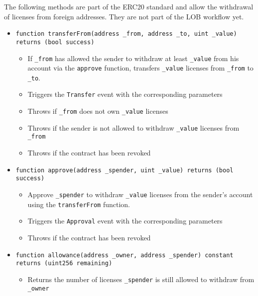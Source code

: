 \documentclass[a4paper]{article}
\begin{document}
\vspace{3mm}

The following methods are part of the ERC20 standard and allow the withdrawal of licenses from foreign addresses. They are not part of the LOB workflow yet.

\vspace{3mm}

\begin{itemize}
  \item \texttt{function transferFrom(address \_from, address \_to, uint \_value) returns (bool success)}
  \begin{itemize}
    \item If \texttt{\_from} has allowed the sender to withdraw at least \texttt{\_value} from his account via the \texttt{approve} function, transfers \texttt{\_value} licenses from \texttt{\_from} to \texttt{\_to}.
    \item Triggers the \texttt{Transfer} event with the corresponding parameters
    \item Throws if \texttt{\_from} does not own \texttt{\_value} licenses
    \item Throws if the sender is not allowed to withdraw \texttt{\_value} licenses from \texttt{\_from}
    \item Throws if the contract has been revoked
  \end{itemize}
  
  \item \texttt{function approve(address \_spender, uint \_value) returns (bool success)}
  \begin{itemize}
    \item Approve \texttt{\_spender} to withdraw \texttt{\_value} licenses from the sender's account using the \texttt{transferFrom} function.
    \item Triggers the \texttt{Approval} event with the corresponding parameters
    \item Throws if the contract has been revoked
  \end{itemize}
  
  \item \texttt{function allowance(address \_owner, address \_spender) constant returns (uint256 remaining)}
  \begin{itemize}
    \item Returns the number of licenses \texttt{\_spender} is still allowed to withdraw from \texttt{\_owner}
  \end{itemize}
\end{itemize}
\end{document}
